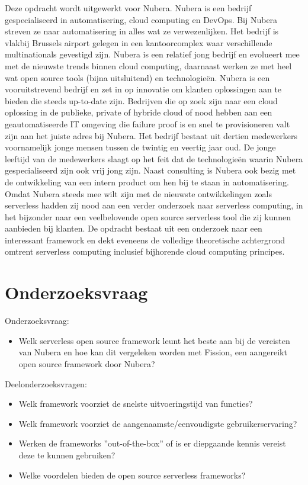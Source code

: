 Deze opdracht wordt uitgewerkt voor Nubera. Nubera is een bedrijf gespecialiseerd in automatisering, cloud computing en DevOps. Bij Nubera streven ze naar automatisering in alles wat ze verwezenlijken. Het bedrijf is vlakbij Brussels airport gelegen in een kantoorcomplex waar verschillende multinationals gevestigd zijn. Nubera is een relatief jong bedrijf en evolueert mee met de nieuwste trends binnen cloud computing, daarnaast werken ze met heel wat open source tools (bijna uitsluitend) en technologieën. Nubera is een vooruitstrevend bedrijf en zet in op innovatie om klanten oplossingen aan te bieden die steeds up-to-date zijn. Bedrijven die op zoek zijn naar een cloud oplossing in de publieke, private of hybride cloud of nood hebben aan een geautomatiseerde IT omgeving die failure proof is en snel te provisioneren valt zijn aan het juiste adres bij Nubera. Het bedrijf bestaat uit dertien medewerkers voornamelijk jonge mensen tussen de twintig en veertig jaar oud. De jonge leeftijd van de medewerkers slaagt op het feit dat de technologieën waarin Nubera gespecialiseerd zijn ook vrij jong zijn. Naast consulting is Nubera ook bezig met de ontwikkeling van een intern product om hen bij te staan in automatisering.
Omdat Nubera steeds mee wilt zijn met de nieuwste ontwikkelingen zoals serverless hadden zij nood aan een verder onderzoek naar serverless computing, in het bijzonder naar een veelbelovende open source serverless tool die zij kunnen aanbieden bij klanten. De opdracht bestaat uit een onderzoek naar een interessant framework en dekt eveneens de volledige theoretische achtergrond omtrent serverless computing inclusief bijhorende cloud computing principes.

\section{Onderzoeksvraag}
\label{sec:onderzoeksvraag}

Onderzoeksvraag: 
\begin{itemize}
    \item Welk serverless open source framework leunt het beste aan bij de vereisten van Nubera en hoe kan dit vergeleken worden met Fission, een aangereikt open source framework door Nubera?
\end{itemize}

Deelonderzoeksvragen: 
\begin{itemize}
    \item Welk framework voorziet de snelste uitvoeringstijd van functies?
    \item Welk framework voorziet de aangenaamste/eenvoudigste gebruikerservaring?
    \item Werken de frameworks ''out-of-the-box'' of is er diepgaande kennis vereist deze te kunnen gebruiken?
    \item Welke voordelen bieden de open source serverless frameworks?
\end{itemize}

